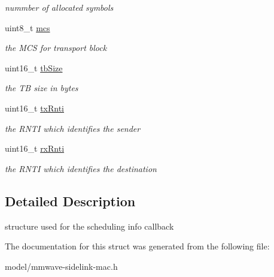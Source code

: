 \begin{DoxyCompactItemize}
\begin{DoxyCompactList}\small\item\em nummber of allocated symbols \end{DoxyCompactList}\item 
\mbox{\label{structns3_1_1millicar_1_1SlSchedulingCallback_a1508f2b45509925dda62e706223dd3f5}} 
uint8\+\_\+t \hyperlink{structns3_1_1millicar_1_1SlSchedulingCallback_a1508f2b45509925dda62e706223dd3f5}{mcs}
\begin{DoxyCompactList}\small\item\em the M\+CS for transport block \end{DoxyCompactList}\item 
\mbox{\label{structns3_1_1millicar_1_1SlSchedulingCallback_a85afa95aa23c0a26f5526a198419bb3c}} 
uint16\+\_\+t \hyperlink{structns3_1_1millicar_1_1SlSchedulingCallback_a85afa95aa23c0a26f5526a198419bb3c}{tb\+Size}
\begin{DoxyCompactList}\small\item\em the TB size in bytes \end{DoxyCompactList}\item 
\mbox{\label{structns3_1_1millicar_1_1SlSchedulingCallback_adb434f6533e5a07eac34e2a12fd93dd7}} 
uint16\+\_\+t \hyperlink{structns3_1_1millicar_1_1SlSchedulingCallback_adb434f6533e5a07eac34e2a12fd93dd7}{tx\+Rnti}
\begin{DoxyCompactList}\small\item\em the R\+N\+TI which identifies the sender \end{DoxyCompactList}\item 
\mbox{\label{structns3_1_1millicar_1_1SlSchedulingCallback_a68acb66f9d0cc3e2387436922f4c0c03}} 
uint16\+\_\+t \hyperlink{structns3_1_1millicar_1_1SlSchedulingCallback_a68acb66f9d0cc3e2387436922f4c0c03}{rx\+Rnti}
\begin{DoxyCompactList}\small\item\em the R\+N\+TI which identifies the destination \end{DoxyCompactList}\end{DoxyCompactItemize}


\subsection{Detailed Description}
structure used for the scheduling info callback 

The documentation for this struct was generated from the following file\+:\begin{DoxyCompactItemize}
\item 
model/mmwave-\/sidelink-\/mac.\+h\end{DoxyCompactItemize}

